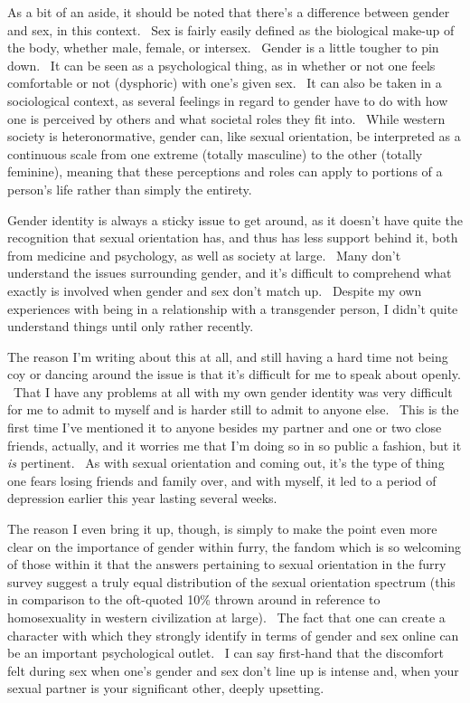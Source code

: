 As a bit of an aside, it should be noted that there's a difference
between gender and sex, in this context. ~Sex is fairly easily defined
as the biological make-up of the body, whether male, female, or
intersex. ~Gender is a little tougher to pin down. ~It can be seen as a
psychological thing, as in whether or not one feels comfortable or not
(dysphoric) with one's given sex. ~It can also be taken in a
sociological context, as several feelings in regard to gender have to do
with how one is perceived by others and what societal roles they fit
into. ~While western society is heteronormative, gender can, like sexual
orientation, be interpreted as a continuous scale from one extreme
(totally masculine) to the other (totally feminine), meaning that these
perceptions and roles can apply to portions of a person's life rather
than simply the entirety.

Gender identity is always a sticky issue to get around, as it doesn't
have quite the recognition that sexual orientation has, and thus has
less support behind it, both from medicine and psychology, as well as
society at large. ~Many don't understand the issues surrounding gender,
and it's difficult to comprehend what exactly is involved when gender
and sex don't match up. ~Despite my own experiences with being in a
relationship with a transgender person, I didn't quite understand things
until only rather recently.

The reason I'm writing about this at all, and still having a hard time
not being coy or dancing around the issue is that it's difficult for me
to speak about openly. ~That I have any problems at all with my own
gender identity was very difficult for me to admit to myself and is
harder still to admit to anyone else. ~This is the first time I've
mentioned it to anyone besides my partner and one or two close friends,
actually, and it worries me that I'm doing so in so public a fashion,
but it \emph{is} pertinent. ~As with sexual orientation and coming out,
it's the type of thing one fears losing friends and family over, and
with myself, it led to a period of depression earlier this year lasting
several weeks.

The reason I even bring it up, though, is simply to make the point even
more clear on the importance of gender within furry, the fandom which is
so welcoming of those within it that the answers pertaining to sexual
orientation in the furry survey suggest a truly equal distribution of
the sexual orientation spectrum (this in comparison to the oft-quoted
10\% thrown around in reference to homosexuality in western civilization
at large). ~The fact that one can create a character with which they
strongly identify in terms of gender and sex online can be an important
psychological outlet. ~I can say first-hand that the discomfort felt
during sex when one's gender and sex don't line up is intense and, when
your sexual partner is your significant other, deeply upsetting.

